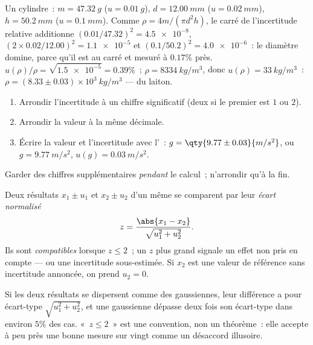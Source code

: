 \begin{example}\label{ex:b1:units-dimensions:density}
Un cylindre~: $m = \qty{47.32}{g}$ ($u = \qty{0.01}{g}$),
$d = \qty{12.00}{mm}$ ($u = \qty{0.02}{mm}$), $h = \qty{50.2}{mm}$
($u = \qty{0.1}{mm}$). Comme $\rho = 4m/(\pi d^2 h)$, le carré de
l'incertitude relative additionne $(0.01/47.32)^2 = \num{4.5e-8}$,
$(2 \times 0.02/12.00)^2 = \num{1.1e-5}$ et
$(0.1/50.2)^2 = \num{4.0e-6}$~: le diamètre domine, parce qu'il est au
carré et mesuré à $0.17\%$ près. $u(\rho)/\rho = \sqrt{\num{1.5e-5}}
= 0.39\%$~; $\rho = \qty{8334}{kg/m^3}$, donc $u(\rho) = \qty{33}{kg/m^3}$~:
$\rho = (8.33 \pm 0.03)\times10^3\ \unit{kg/m^3}$ --- du laiton.
\end{example}

\begin{method}\label{met:b1:units-dimensions:writing}
\begin{enumerate}
  \item Arrondir l'incertitude à un chiffre significatif (deux si le
        premier est $1$ ou $2$).
  \item Arrondir la valeur à la même décimale.
  \item Écrire la valeur et l'incertitude avec l'~:
        $g = \qty{9.77\pm0.03}{m/s^2}$, ou $g = \qty{9.77}{m/s^2}$,
        $u(g) = \qty{0.03}{m/s^2}$.
\end{enumerate}
Garder des chiffres supplémentaires \emph{pendant} le calcul~; n'arrondir qu'à la fin.
\end{method}

\begin{definition}\label{def:b1:units-dimensions:zscore}
Deux résultats $x_1 \pm u_1$ et $x_2 \pm u_2$ d'un même  se
comparent par leur \emph{écart normalisé}
\[
z = \frac{\abs{x_1 - x_2}}{\sqrt{u_1^2 + u_2^2}} .
\]
Ils sont \emph{compatibles} lorsque $z \leq 2$~; un $z$ plus grand
signale un effet non pris en compte --- ou une incertitude sous-estimée.
Si $x_2$ est une valeur de référence sans incertitude annoncée, on prend
$u_2 = 0$.
\end{definition}

\begin{remark}[Pourquoi 2]\label{rem:b1:units-dimensions:why2}
Si les deux résultats se dispersent comme des gaussiennes, leur
différence a pour écart-type $\sqrt{u_1^2 + u_2^2}$, et une gaussienne
dépasse deux fois son écart-type dans environ $5\%$ des cas.
«~$z \leq 2$~» est une convention, non un théorème~: elle accepte à peu
près une bonne mesure sur vingt comme un désaccord illusoire.
\end{remark}

